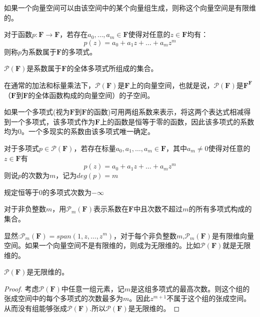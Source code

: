 \documentclass[10pt,a4paper,UTF8]{article}
\begin{document}
\begin{definition}[有限维向量空间]
如果一个向量空间可以由该空间中的某个向量组生成，则称这个向量空间是有限维的。
\end{definition}

\begin{definition}
对于函数\(p: \mathbf{F} \rightarrow \mathbf{F}\)，若存在\(a_{0},\ldots ,a_{m}\in \mathbf{F}\)使得对任意的\(z\in \mathbf{F}\)均有：\[p(z) = a_{0} + a_{1}z + \ldots + a_{m}z^{m}\]则称\(p\)为系数属于\(\mathbf{F}\)的多项式。

\(\mathcal{P}(\mathbf{F})\)是系数属于\(\mathbf{F}\)的全体多项式所组成的集合。
\end{definition}

在通常的加法和标量乘法下，\(\mathcal{P}(\mathbf{F})\)是\(\mathbf{F}\)上的向量空间，也就是说，\(\mathcal{P}(\mathbf{F})\)是\(\mathbf{F}^{\mathbf{F}}\)（\(\mathbf{F}\)到\(\mathbf{F}\)的全体函数构成的向量空间）的子空间。

如果一个多项式(视为\(\mathbf{F}\)到\(\mathbf{F}\)的函数)可用两组系数来表示，将这两个表达式相减得到一个多项式，该多项式作为\(\mathbf{F}\)上的函数是恒等于零的函数，因此该多项式的系数均为\(0\)。一个多现实的系数由该多项式唯一确定。

\begin{definition}[多项式的次数]
对于多项式\(p\in \mathcal{P}(\mathbf{F})\)，若存在标量\(a_{0},a_{1},\ldots ,a_{m}\in \mathbf{F}\)，其中\(a_{m}\neq 0\)使得对任意的\(z\in \mathbf{F}\)有\[p(z) = a_{0} + a_{1}z + \ldots + a_{m}z^{m}\]则说\(p\)的次数为\(m\)，记为\(deg(p) = m\)

规定恒等于0的多项式次数为\(-\infty\)
\end{definition}

\begin{definition}
对于非负整数\(m\)，用\(\mathcal{P}_{m}(\mathbf{F})\)表示系数在\(\mathbf{F}\)中且次数不超过\(m\)的所有多项式构成的集合。
\end{definition}
显然:\(\mathcal{P}_{m}(\mathbf{F}) = span(1,z,\ldots ,z^{m})\)，对于每个非负整数\(m\),\(\mathcal{P}_{m}(\mathbf{F})\)是有限维向量空间。如果一个向量空间不是有限维的，则成为无限维的。比如\(\mathcal{P}(\mathbf{F})\)就是无限维的。


\begin{theorem}
\(\mathcal{P}(\mathbf{F})\)是无限维的。
\end{theorem}
\begin{proof}
考虑\(\mathcal{P}(\mathbf{F})\)中任意一组元素，记\(m\)是这组多项式的最高次数。则这个组的张成空间中的每个多项式的次数最多为\(m\)。因此\(z^{m+1}\)不属于这个组的张成空间。从而没有组能够张成\(\mathcal{P}(\mathbf{F})\).所以\(\mathcal{P}(\mathbf{F})\)是无限维的。
\end{proof}
\end{document}
